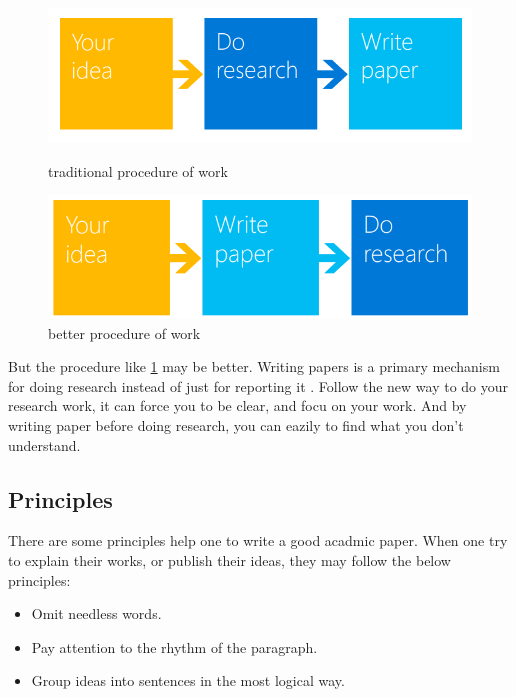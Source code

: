 \documentclass{article}
\begin{document}
\begin{figure}[]
    \centering
    \includegraphics[width=1\textwidth]{1.png}    
    \caption{traditional procedure of work}
    \label{oldway}
    \includegraphics[width=1\textwidth]{2.png}    
    \caption{better procedure of work}
    \label{newway}
\end{figure}

But the procedure like \ref{newway} may be better.
Writing papers is a primary mechanism for doing research instead of just for reporting it \cite{AGreatResearchPaper}.
Follow the new way to do your research work, it can force you to be clear, 
and focu on your work.
And by writing paper before doing research, you can eazily to find what you don't understand.

\subsection{Principles}
There are some principles help one to write a good acadmic paper.
When one try to explain their works, or publish their ideas, 
they may follow the below principles:
\begin{itemize}
    \item Omit needless words.
    \item Pay attention to the rhythm of the paragraph.
    \item Group ideas into sentences in the most logical way.
\end{itemize}

\printbibliography
\end{document}
